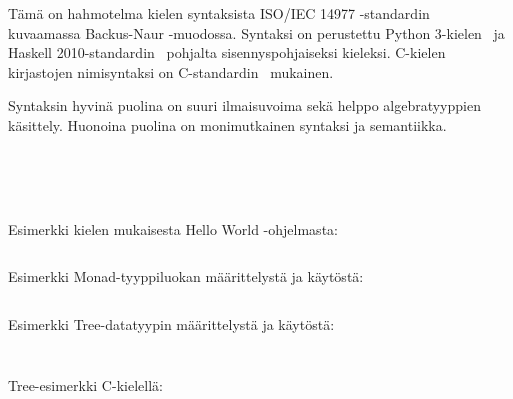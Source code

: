 
Tämä on hahmotelma kielen syntaksista ISO/IEC 14977
-standardin~\citep{iso14977} kuvaamassa Backus-Naur -muodossa. Syntaksi on
perustettu Python 3-kielen~\citep{pythonsyntax} ja Haskell
2010-standardin~\citep{haskellsyntax} pohjalta sisennyspohjaiseksi kieleksi.
C-kielen kirjastojen nimisyntaksi on C-standardin~\citep{C11} mukainen.

Syntaksin hyvinä puolina on suuri ilmaisuvoima sekä helppo algebratyyppien
käsittely. Huonoina puolina on monimutkainen syntaksi ja semantiikka.

\inputminted{abnf}{kieli-base.bnf}
\inputminted{abnf}{kieli-imports.bnf}
\newpage
\inputminted{abnf}{kieli-types.bnf}
\inputminted{abnf}{kieli-data.bnf}
\newpage
\inputminted{abnf}{kieli-body.bnf}
\newpage

Esimerkki kielen mukaisesta Hello World -ohjelmasta:

\def\mylexer{kieli_lexer.py:KieliLexer -x}
\inputminted{\mylexer}{example.kieli}

Esimerkki Monad-tyyppiluokan määrittelystä ja käytöstä:

\inputminted{\mylexer}{monad.kieli}

\newpage

Esimerkki Tree-datatyypin määrittelystä ja käytöstä:

\inputminted{\mylexer}{tree.kieli}
\inputminted{text}{tree-output}
\newpage

Tree-esimerkki C-kielellä:

\inputminted{C}{tree.c}
